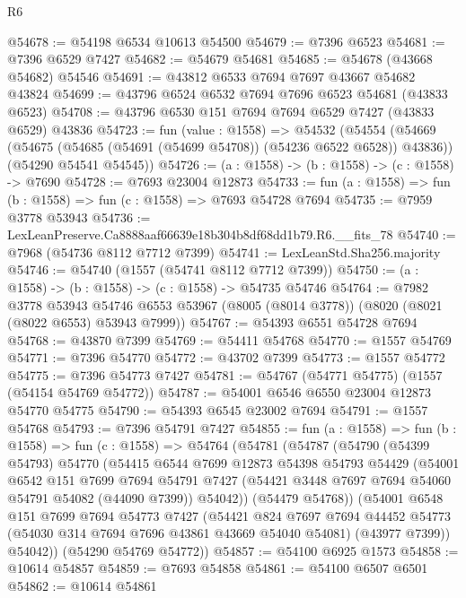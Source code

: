 \begin{lexlean}{R6}
\begin{coremodule}
@54678 := @54198 @6534 @10613 @54500
@54679 := @7396 @6523
@54681 := @7396 @6529 @7427
@54682 := @54679 @54681
@54685 := @54678 (@43668 @54682) @54546
@54691 := @43812 @6533 @7694 @7697 @43667 @54682 @43824
@54699 := @43796 @6524 @6532 @7694 @7696 @6523 @54681 (@43833 @6523)
@54708 := @43796 @6530 @151 @7694 @7694 @6529 @7427 (@43833 @6529) @43836
@54723 := fun (value : @1558) =>
  @54532
    (@54554
      (@54669 (@54675 (@54685 (@54691 (@54699 @54708)) (@54236 @6522 @6528)) @43836))
      (@54290 @54541 @54545))
@54726 := (a : @1558) -> (b : @1558) -> (c : @1558) -> @7690
@54728 := @7693 @23004 @12873
@54733 := fun (a : @1558) => fun (b : @1558) => fun (c : @1558) => @7693 @54728 @7694
@54735 := @7959 @3778 @53943
@54736 := LexLeanPreserve.Ca8888aaf66639e18b304b8df68dd1b79.R6.__fits_78
@54740 := @7968 (@54736 @8112 @7712 @7399)
@54741 := LexLeanStd.Sha256.majority
@54746 := @54740 (@1557 (@54741 @8112 @7712 @7399))
@54750 := (a : @1558) -> (b : @1558) -> (c : @1558) -> @54735 @54746
@54764 := @7982
    @3778
    @53943
    @54746
    @6553
    @53967
    (@8005 (@8014 @3778))
    (@8020 (@8021 (@8022 @6553) @53943 @7999))
@54767 := @54393 @6551 @54728 @7694
@54768 := @43870 @7399
@54769 := @54411 @54768
@54770 := @1557 @54769
@54771 := @7396 @54770
@54772 := @43702 @7399
@54773 := @1557 @54772
@54775 := @7396 @54773 @7427
@54781 := @54767 (@54771 @54775) (@1557 (@54154 @54769 @54772))
@54787 := @54001 @6546 @6550 @23004 @12873 @54770 @54775
@54790 := @54393 @6545 @23002 @7694
@54791 := @1557 @54768
@54793 := @7396 @54791 @7427
@54855 := fun (a : @1558) =>
  fun (b : @1558) =>
  fun (c : @1558) =>
  @54764
    (@54781
      (@54787
        (@54790
          (@54399 @54793)
          @54770
          (@54415
            @6544
            @7699
            @12873
            @54398
            @54793
            @54429
            (@54001
              @6542
              @151
              @7699
              @7694
              @54791
              @7427
              (@54421 @3448 @7697 @7694 @54060 @54791 @54082 (@44090 @7399))
              @54042))
          (@54479 @54768))
        (@54001
          @6548
          @151
          @7699
          @7694
          @54773
          @7427
          (@54421
            @824
            @7697
            @7694
            @44452
            @54773
            (@54030 @314 @7694 @7696 @43861 @43669 @54040 @54081)
            (@43977 @7399))
          @54042))
      (@54290 @54769 @54772))
@54857 := @54100 @6925 @1573
@54858 := @10614 @54857
@54859 := @7693 @54858
@54861 := @54100 @6507 @6501
@54862 := @10614 @54861

\end{coremodule}
\end{lexlean}
